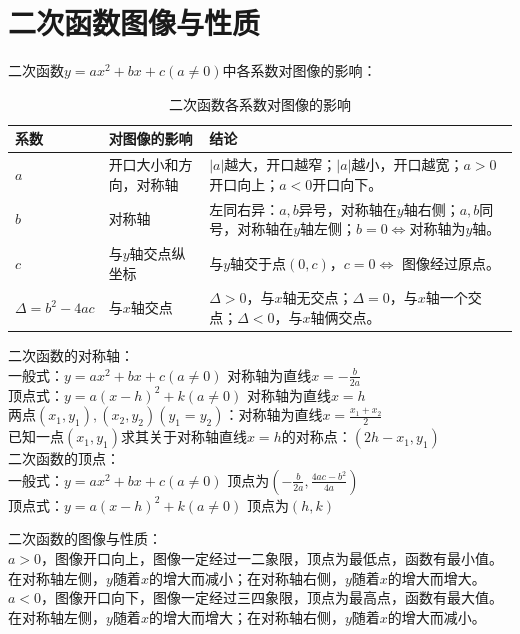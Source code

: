 \documentclass{ecnuthesis}
\begin{document}
\section{二次函数图像与性质}
\begin{knowledge}
    二次函数$y=ax^2+bx+c(a\ne 0)$中各系数对图像的影响：
\end{knowledge}
\begin{table}[H]
\centering
\caption{二次函数各系数对图像的影响}
\begin{tabular}{l|l|p{8cm}}
\hline
\hline
系数 & 对图像的影响 & 结论 \\
\hline
$a$ & 开口大小和方向，对称轴 & $|a|$越大，开口越窄；$|a|$越小，开口越宽；$a>0$开口向上；$a<0$开口向下。 \\
$b$ & 对称轴 & 左同右异：$a,b$异号，对称轴在$y$轴右侧；$a,b$同号，对称轴在$y$轴左侧；$b=0\Leftrightarrow$对称轴为$y$轴。 \\
$c$ & 与$y$轴交点纵坐标 & 与$y$轴交于点$(0,c)$，$c=0\Leftrightarrow$ 图像经过原点。 \\
$\Delta=b^2-4ac$ & 与$x$轴交点 & $\Delta>0$，与$x$轴无交点；$\Delta=0$，与$x$轴一个交点；$\Delta<0$，与$x$轴俩交点。\\
\hline
\hline
\end{tabular}
\end{table}
\begin{knowledge}
    二次函数的对称轴：\\
    一般式：$y=ax^2+bx+c(a\ne 0)$ 对称轴为直线$x=-\frac{b}{2a}$ \\
    顶点式：$y=a(x-h)^2+k(a\ne 0)$ 对称轴为直线$x=h$ \\
    两点$(x_1,y_1),(x_2,y_2)(y_1=y_2)$：对称轴为直线$x=\frac{x_1+x_2}{2}$ \\
    已知一点$(x_1,y_1)$求其关于对称轴直线$x=h$的对称点：$(2h-x_1,y_1)$ \\
    二次函数的顶点： \\
    一般式：$y=ax^2+bx+c(a\ne 0)$ 顶点为$(-\frac{b}{2a},\frac{4ac-b^2}{4a})$ \\
    顶点式：$y=a(x-h)^2+k(a\ne 0)$ 顶点为$(h,k)$
\end{knowledge}
\begin{knowledge}
    二次函数的图像与性质：\\
    $a>0$，图像开口向上，图像一定经过一二象限，顶点为最低点，函数有最小值。在对称轴左侧，$y$随着$x$的增大而减小；在对称轴右侧，$y$随着$x$的增大而增大。\\
    $a<0$，图像开口向下，图像一定经过三四象限，顶点为最高点，函数有最大值。在对称轴左侧，$y$随着$x$的增大而增大；在对称轴右侧，$y$随着$x$的增大而减小。
\end{knowledge}
\end{document}
